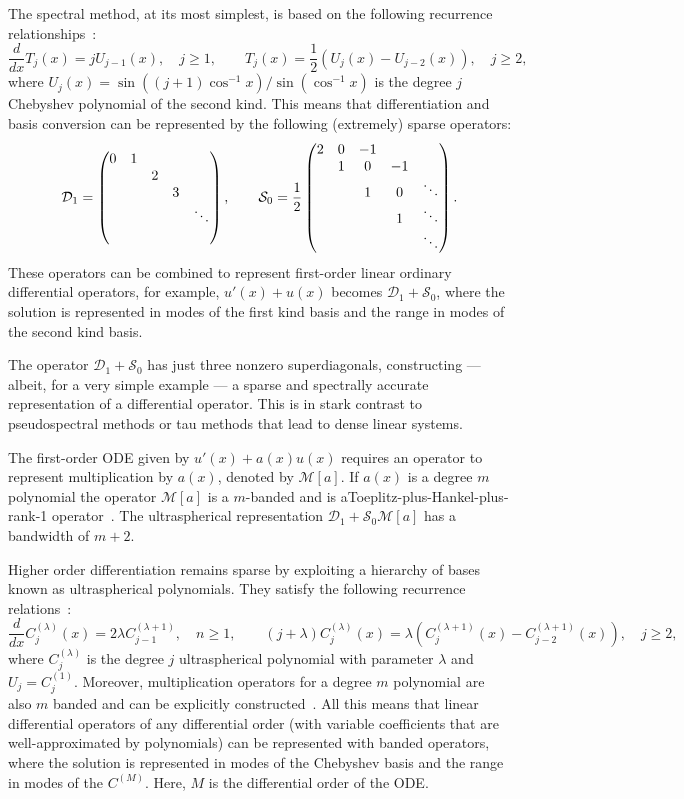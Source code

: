 \documentclass[11pt,a4paper,review]{siamart171218}
\begin{document}
The spectral method, at its most simplest, is based on the following recurrence relationships~\cite[(18.9.21) \& (18.9.9)]{NISTHandbook}: 
\[
 \frac{d}{dx} T_j(x) = jU_{j-1}(x), \quad j\geq 1, \qquad T_j(x) = \frac{1}{2}\left(U_{j}(x)-U_{j-2}(x)\right), \quad j\geq 2,
\]
where $U_{j}(x) = \sin((j+1)\cos^{-1}x)/\sin(\cos^{-1}x)$ is the degree $j$ Chebyshev polynomial of the second kind. This means that differentiation and basis conversion can be represented by the following (extremely) sparse operators:
\[
 \mathcal{D}_1 = \begin{pmatrix}0 & 1 \cr &&2\cr &&&3\cr &&&&\ddots\cr & \end{pmatrix}, \qquad \mathcal{S}_0 = \frac{1}{2}\begin{pmatrix}2 & 0 &-1\cr & 1 & 0 & -1 \cr && 1 & 0 & \ddots\cr &&& 1 &\ddots\cr &&&&\ddots  \end{pmatrix}.  
\]
These operators can be combined to represent first-order linear ordinary differential operators, for example, $u'(x) + u(x)$ becomes $\mathcal{D}_1 + \mathcal{S}_0$, where the solution is represented in modes of the first kind basis and the range in modes of the second kind basis. 

The operator $\mathcal{D}_1 + \mathcal{S}_0$ has just three nonzero superdiagonals, constructing --- albeit, for a very simple example --- a sparse and spectrally accurate representation of a differential operator.  This is in stark contrast to pseudospectral methods or tau methods that lead to dense linear systems.  

The first-order ODE given by $u'(x)+a(x)u(x)$ requires an operator to represent multiplication by $a(x)$, denoted by $\mathcal{M}[a]$. If $a(x)$ is a degree $m$ polynomial the operator $\mathcal{M}[a]$ is a $m$-banded and is aToeplitz-plus-Hankel-plus-rank-1 operator~\cite{Olver_13_01}. The ultraspherical representation $\mathcal{D}_1 + \mathcal{S}_0\mathcal{M}[a]$ has a bandwidth of $m+2$. 

Higher order differentiation remains sparse by exploiting a hierarchy of bases known as ultraspherical polynomials. They satisfy the following recurrence relations~\cite[(18.9.19),(18.9.7)]{NISTHandbook}:
\[
 \frac{d}{dx}C_j^{(\lambda)}(x) = 2\lambda C_{j-1}^{(\lambda+1)},\quad n\geq 1, \qquad (j+\lambda)C_j^{(\lambda)}(x) = \lambda\left(C_{j}^{(\lambda+1)}(x) -C_{j-2}^{(\lambda+1)}(x)\right), \quad j\geq 2,
\]
where $C^{(\lambda)}_j$ is the degree $j$ ultraspherical polynomial with parameter $\lambda$ and $U_j = C^{(1)}_j$. Moreover, multiplication operators for a degree $m$ polynomial are also $m$ banded and can be explicitly constructed~\cite{Olver_13_01}. All this means that linear differential operators of any differential order (with variable coefficients that are well-approximated by polynomials) can be represented with banded operators, where the solution is represented in modes of the Chebyshev basis and the range in modes of the $C^{(M)}$. Here, $M$ is the differential order of the ODE. 
\end{document}
